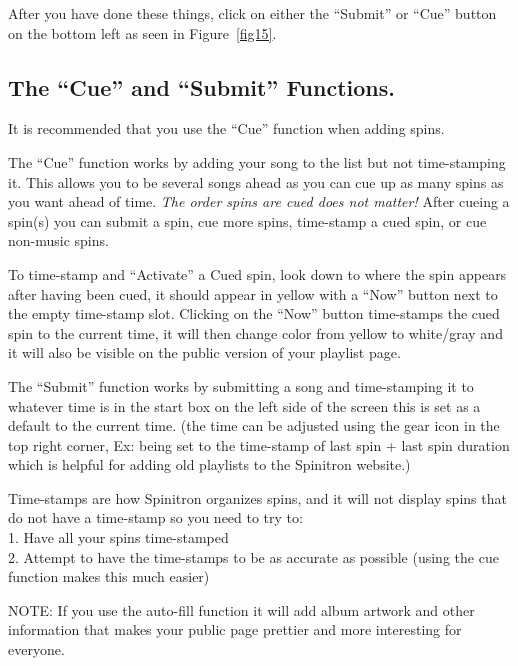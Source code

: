 \documentclass[12pt]{article}
\begin{document}
After you have done these things, click on either the ``Submit'' or ``Cue'' button on the bottom left as seen in Figure~\ref{fig15}.

\subsection{The ``Cue'' and ``Submit'' Functions.}

It is recommended that you use the ``Cue'' function when adding spins. 

The ``Cue'' function works by adding your song to the list but not time-stamping it. This allows you to be several songs ahead as you can cue up as many spins as you want ahead of time. {\it The order spins are cued does not matter!} After cueing a spin(s) you can submit a spin, cue more spins, time-stamp a cued spin, or cue non-music spins. 

To time-stamp and ``Activate'' a Cued spin, look down to where the spin appears after having been cued, it should appear in yellow with a ``Now'' button next to the empty time-stamp slot. Clicking on the ``Now'' button time-stamps the cued spin to the current time, it will then change color from yellow to white/gray and it will also be visible on the public version of your playlist page. 


The ``Submit'' function works by submitting a song and time-stamping it to whatever time is in the start box on the left side of the screen this is set as a default to the current time. (the time can be adjusted using the gear icon in the top right corner, Ex: being set to the time-stamp of last spin + last spin duration which is helpful for adding old playlists to the Spinitron website.) 

Time-stamps are how Spinitron organizes spins, and it will not display spins that do not have a time-stamp so you need to try to: 
\\
1. Have all your spins time-stamped 
\\
2. Attempt to have the time-stamps to be as accurate as possible (using the cue function makes this much easier)


NOTE: If you use the auto-fill function it will add album artwork and other information that makes your public page prettier and more interesting for everyone.

\end{document}
